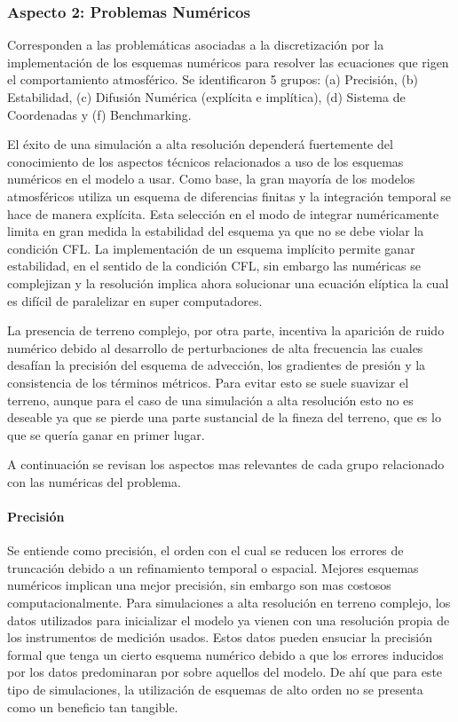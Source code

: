 \subsubsection{Aspecto 2: Problemas Numéricos}
Corresponden a las problemáticas asociadas a la discretización por la implementación de los esquemas numéricos para resolver las ecuaciones que rigen el comportamiento atmosférico. Se identificaron 5 grupos: (a) Precisión, (b) Estabilidad, (c) Difusión Numérica (explícita e implítica), (d) Sistema de Coordenadas y (f) Benchmarking.

El éxito de una simulación a alta resolución dependerá fuertemente del conocimiento de los aspectos técnicos relacionados a uso de los esquemas numéricos en el modelo a usar. Como base, la gran mayoría de los modelos atmosféricos utiliza un esquema de diferencias finitas y la integración temporal se hace de manera explícita. Esta selección en el modo de integrar numéricamente limita en gran medida la estabilidad del esquema ya que no se debe violar la condición CFL. La implementación de un esquema implícito permite ganar estabilidad, en el sentido de la condición CFL, sin embargo las numéricas se complejizan y la resolución implica ahora solucionar una ecuación elíptica la cual es difícil de paralelizar en super computadores.

La presencia de terreno complejo, por otra parte, incentiva la aparición de ruido numérico debido al desarrollo de perturbaciones de alta frecuencia las cuales desafían la precisión del esquema de advección, los gradientes de presión y la consistencia de los términos métricos. Para evitar esto se suele suavizar el terreno, aunque para el caso de una simulación a alta resolución esto no es deseable ya que se pierde una parte sustancial de la fineza del terreno, que es lo que se quería ganar en primer lugar. 

A continuación se revisan los aspectos mas relevantes de cada grupo relacionado con las numéricas del problema.

\paragraph{Precisión} Se entiende como precisión, el orden con el cual se reducen los errores de truncación debido a un refinamiento temporal o espacial. Mejores esquemas numéricos implican una mejor precisión, sin embargo son mas costosos computacionalmente. Para simulaciones a alta resolución en terreno complejo, los datos utilizados para inicializar el modelo ya vienen con una resolución propia de los instrumentos de medición usados. Estos datos pueden ensuciar la precisión formal que tenga un cierto esquema numérico debido a que los errores inducidos por los datos predominaran por sobre aquellos del modelo. De ahí que para este tipo de simulaciones, la utilización de esquemas de alto orden no se presenta como un beneficio tan tangible.

